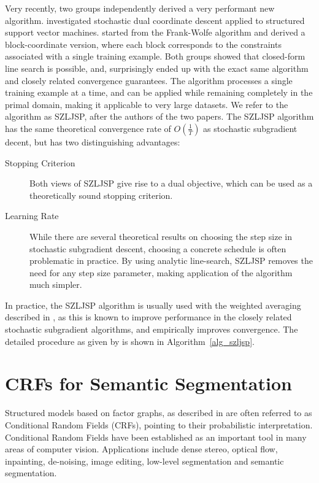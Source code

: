 Very recently, two groups independently derived a very performant new algorithm.
\citet{shalev2012proximal} investigated stochastic dual coordinate descent applied
to structured support vector machines. \citet{lacoste2012block} started from the Frank-Wolfe algorithm %
and derived a block-coordinate version, where each block corresponds to the
constraints associated with a single training example.  Both groups showed that
closed-form line search is possible, and, surprisingly ended up with the exact
same algorithm and closely related convergence guarantees.  The algorithm
processes a single training example at a time, and can be applied while
remaining completely in the primal domain, making it applicable to very large
datasets.  We refer to the algorithm as SZLJSP, after the authors of the
two papers.
%
The SZLJSP algorithm has the same theoretical convergence rate of $O(\frac{1}{T})$
as stochastic subgradient decent, but has two distinguishing advantages:
\begin{description}
\item[Stopping Criterion] Both views of SZLJSP give rise to a dual objective,
    which can be used as a theoretically sound stopping criterion.
\item[Learning Rate] While there are several theoretical results on choosing
    the step size in stochastic subgradient descent, choosing a concrete
    schedule is often problematic in practice. By using analytic line-search,
    SZLJSP removes the need for any step size parameter, making application
    of the algorithm much simpler.
\end{description}

In practice, the SZLJSP algorithm is usually used with the weighted averaging
described in , as this is known to improve performance in the
closely related stochastic subgradient algorithms, and empirically improves
convergence.
\enlargethispage{10mm}
The detailed procedure as given by \citet{lacoste2012block} is shown in Algorithm~\ref{alg_szljsp}.

\section{CRFs for Semantic Segmentation}
Structured models based on factor graphs, as described in  are often
referred to as Conditional Random Fields (CRFs), pointing to their
probabilistic interpretation.
Conditional Random Fields have been established as an important tool in many
areas of computer vision. Applications include dense stereo, optical flow, 
inpainting, de-noising, image editing, low-level segmentation and semantic segmentation.

